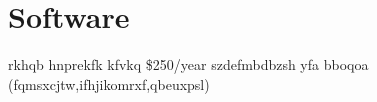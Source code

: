 \section{Software}
rkhqb hnprekfk kfvkq \$250/year szdefmbdbzsh yfa bboqoa (fqmsxcjtw,ifhjikomrxf,qbeuxpsl)
